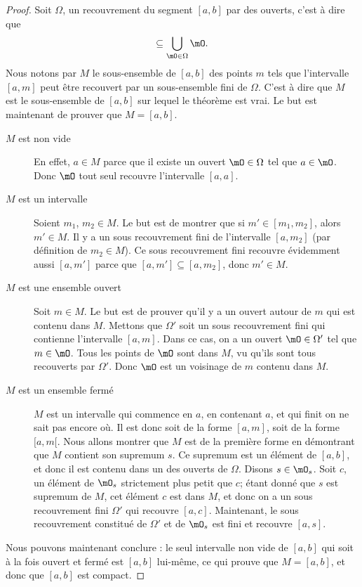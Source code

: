 \begin{proof}
    Soit $\Omega$, un recouvrement du segment $[a,b]$ par des ouverts, c'est à dire que
    \begin{equation}
        [a,b]\subseteq\bigcup_{\mO\in\Omega}\mO.
    \end{equation}
    Nous notons par $M$ le sous-ensemble de $[a,b]$ des points $m$ tels que l'intervalle $[a,m]$ peut être recouvert par un sous-ensemble fini de $\Omega$. C'est à dire que $M$ est le sous-ensemble de $[a,b]$ sur lequel le théorème est vrai. Le but est maintenant de prouver que $M=[a,b]$.
    \begin{description}
        \item[$M$ est non vide] En effet, $a\in M$ parce que il existe un ouvert $\mO\in\Omega$ tel que $a\in\mO$. Donc $\mO$ tout seul recouvre l'intervalle $[a,a]$.
        \item[$M$ est un intervalle] Soient $m_1$, $m_2\in M$. Le but est de montrer que si $m'\in[m_1,m_2]$, alors $m'\in M$. Il y a un sous recouvrement fini de l'intervalle $[a,m_2]$ (par définition de $m_2\in M$). Ce sous recouvrement fini recouvre évidemment aussi $[a,m']$ parce que $[a,m']\subseteq [a,m_2]$, donc $m'\in M$.
        \item[$M$ est une ensemble ouvert] Soit $m\in M$. Le but est de prouver qu'il y a un ouvert autour de $m$ qui est contenu dans $M$. Mettons que $\Omega'$ soit un sous recouvrement fini qui contienne l'intervalle $[a,m]$. Dans ce cas, on a un ouvert $\mO\in\Omega'$ tel que $m\in\mO$. Tous les points de $\mO$ sont dans $M$, vu qu'ils sont tous recouverts par $\Omega'$. Donc $\mO$ est un voisinage de $m$ contenu dans $M$.
        \item[$M$ est un ensemble fermé] $M$ est un intervalle qui commence en $a$, en contenant $a$, et qui finit on ne sait pas encore où. Il est donc soit de la forme $[a,m]$, soit de la forme $[a,m[$. Nous allons montrer que $M$ est de la première forme en démontrant que $M$ contient son supremum $s$. Ce supremum est un élément de $[a,b]$, et donc il est contenu dans un des ouverts de $\Omega$. Disons $s\in\mO_s$. Soit $c$, un élément de $\mO_s$ strictement plus petit que $c$; étant donné que $s$ est supremum de $M$, cet élément $c$ est dans $M$, et donc on a un sous recouvrement fini $\Omega'$ qui recouvre $[a,c]$. Maintenant, le sous recouvrement constitué de $\Omega'$ et de $\mO_s$ est fini et recouvre $[a,s]$.
    \end{description}
    Nous pouvons maintenant conclure : le seul intervalle non vide de $[a,b]$ qui soit à la fois ouvert et fermé est $[a,b]$ lui-même, ce qui prouve que $M=[a,b]$, et donc que $[a,b]$ est compact.
\end{proof}

